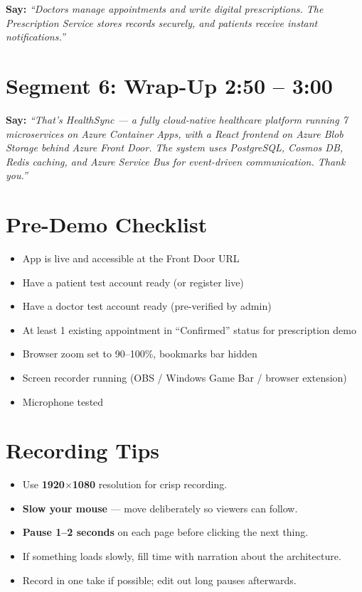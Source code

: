\documentclass[11pt,a4paper]{article}
\begin{document}
\textbf{Say:} \textit{``Doctors manage appointments and write digital prescriptions. The Prescription Service stores records securely, and patients receive instant notifications.''}

\section{Segment 6: Wrap-Up \hfill \textcolor{timecolor}{\normalsize 2:50 -- 3:00}}

\textbf{Say:} \textit{``That's HealthSync --- a fully cloud-native healthcare platform running 7 microservices on Azure Container Apps, with a React frontend on Azure Blob Storage behind Azure Front Door. The system uses PostgreSQL, Cosmos DB, Redis caching, and Azure Service Bus for event-driven communication. Thank you.''}

\vspace{12pt}

\section*{Pre-Demo Checklist}

\begin{itemize}[leftmargin=1.5em]
  \item[$\square$] App is live and accessible at the Front Door URL
  \item[$\square$] Have a patient test account ready (or register live)
  \item[$\square$] Have a doctor test account ready (pre-verified by admin)
  \item[$\square$] At least 1 existing appointment in ``Confirmed'' status for prescription demo
  \item[$\square$] Browser zoom set to 90--100\%, bookmarks bar hidden
  \item[$\square$] Screen recorder running (OBS / Windows Game Bar / browser extension)
  \item[$\square$] Microphone tested
\end{itemize}

\vspace{8pt}

\section*{Recording Tips}

\begin{itemize}[leftmargin=1.5em]
  \item Use \textbf{1920$\times$1080} resolution for crisp recording.
  \item \textbf{Slow your mouse} --- move deliberately so viewers can follow.
  \item \textbf{Pause 1--2 seconds} on each page before clicking the next thing.
  \item If something loads slowly, fill time with narration about the architecture.
  \item Record in one take if possible; edit out long pauses afterwards.
\end{itemize}
\end{document}
